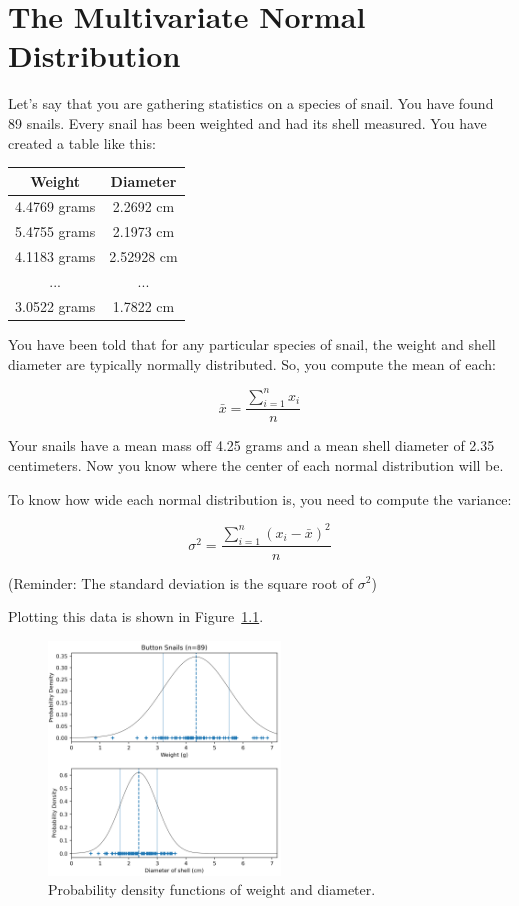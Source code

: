 \chapter{The Multivariate Normal Distribution}

Let's say that you are gathering statistics on a species of snail. You have found 89 snails.
Every snail has been weighted and had its shell measured. You have created a table like this:

\begin{tabular}{ c c }
Weight & Diameter \\
\hline
4.4769 grams & 2.2692 cm\\
5.4755 grams & 2.1973 cm\\
4.1183 grams & 2.52928 cm\\
... & ... \\
3.0522 grams & 1.7822 cm
\end{tabular}


You have been told that for any particular species of snail, the weight and shell diameter are typically normally distributed.
So, you compute the mean of each:

$$\bar{x} = \frac{\sum_{i=1}^{n} x_i}{n}$$

Your snails have a mean mass off 4.25 grams and a mean shell diameter of 2.35 centimeters.
Now you know where the center of each normal distribution will be.

To know how wide each normal distribution is, you need to compute the variance:

$$\sigma^2 = \frac{\sum_{i=1}^{n} (x_i - \bar{x})^2}{n}$$

(Reminder: The standard deviation is the square root of $\sigma^2$)

Plotting this data is shown in Figure~\ref{fig:pdfweight_diameter}.
\begin{figure}[htbp]
    \centering
    \includegraphics[width=0.55\textwidth]{separate.png}
    \caption{Probability density functions of weight and diameter.}
    \label{fig:pdfweight_diameter}
\end{figure}


